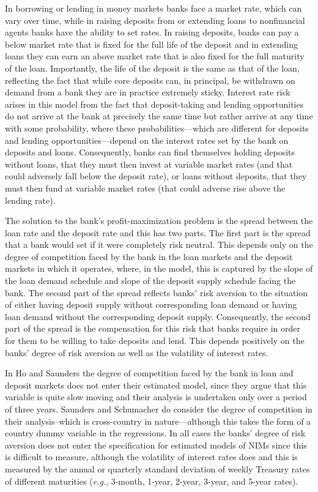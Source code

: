 \documentclass[11pt]{article}
\begin{document}
In borrowing or lending in money markets banks face a market rate, which can vary over time, while in raising deposits from or extending loans to nonfinancial agents banks have the ability to set rates.  In raising deposits, banks can pay a below market rate that is fixed for the full life of the deposit and in extending loans they can earn an above market rate that is also fixed for the full maturity of the loan.  Importantly, the life of the deposit is the same as that of the loan, reflecting the fact that while core deposits can, in principal, be withdrawn on demand from a bank they are in practice extremely sticky.  Interest rate risk arises in this model from the fact that deposit-taking and lending opportunities do not arrive at the bank at precisely the same time but rather arrive at any time with some probability, where these probabilities---which are different for deposits and lending opportunities---depend on the interest rates set by the bank on deposits and loans.  Consequently, banks can find themselves holding deposits without loans, that they must then invest at variable market rates (and that could adversely fall below the deposit rate), or loans without deposits, that they must then fund at variable market rates (that could adverse rise above the lending rate).

The solution to the bank's profit-maximization problem is the spread between the loan rate and the deposit rate and this has two parts. The first part is the spread that a bank would set if it were completely risk neutral. This depends only on the degree of competition faced by the bank in the loan markets and the deposit markets in which it operates, where, in the model, this is captured by the slope of the loan demand schedule and slope of the deposit supply schedule facing the bank. The second part of the spread reflects banks' risk aversion to the situation of either having deposit supply without corresponding loan demand or having loan demand without the corresponding deposit supply. Consequently, the second part of the spread is the compensation for this risk that banks require in order for them to be willing to take deposits and lend. This depends positively on the banks' degree of risk aversion as well as the volatility of interest rates.

In Ho and Saunders the degree of competition faced by the bank in loan and deposit markets does not enter their estimated model, since they argue that this variable is quite slow moving and their analysis is undertaken only over a period of three years.  Saunders and Schumacher do consider the degree of competition in their analysis--which is cross-country in nature---although this takes the form of a country dummy variable in the regressions. In all cases the banks' degree of risk aversion does not enter the specification for estimated models of NIMs since this is difficult to measure, although the volatility of interest rates does and this is measured by the annual or quarterly standard deviation of weekly Treasury rates of different maturities (\textit{e.g.}, 3-month, 1-year, 2-year, 3-year, and 5-year rates).
\end{document}
